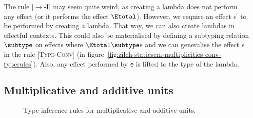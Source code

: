 The rule \textsc{[$\rightarrow$-I]} may seem quite weird, as creating a lambda does not perform any effect (or it performs the effect $\Etotal$).
However, we require an effect $\epsilon^\prime$ to be performed by creating a lambda.
That way, we can also create lambdas in effectful contexts.
This could also be materialised by defining a subtyping relation $\subtype$ on effects where $\Etotal \subtype \epsilon$ and we can generalise the effect $\epsilon$ in the rule \textsc{[Type-Conv]} (in figure~\ref{fig:zilch-staticsem-multiplicities-conv-typerules}).
Also, any effect performed by \texttt{e} is lifted to the type of the lambda.

\subsection{Multiplicative and additive units}\label{subsec:zilch-staticsem-exprs-units}

\begin{figure}[H]

	\caption{Type inference rules for multiplicative and additive units.}
	\label{fig:zilch-staticsem-exprs-units-typerules}
\end{figure}

